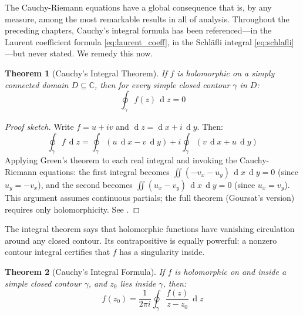 \documentclass[12pt,a4paper]{report}
\DeclareMathOperator{\deriv}{d}
\theoremstyle{thms}
\newtheorem{theorem}{Theorem}[section]
\theoremstyle{defns}
\begin{document}
The Cauchy-Riemann equations have a global consequence that is, by any measure, among the most remarkable results in all of analysis. Throughout the preceding chapters, Cauchy's integral formula has been referenced—in the Laurent coefficient formula \eqref{eq:laurent_coeff}, in the Schl\"{a}fli integral \eqref{eq:schlafli}—but never stated. We remedy this now.

\begin{theorem}[Cauchy's Integral Theorem]
    If $f$ is holomorphic on a simply connected domain $D \subseteq \mathbb{C}$, then for every simple closed contour $\gamma$ in $D$:
    \begin{equation}
        \oint_\gamma f(z)\,\deriv{z} = 0
    \end{equation}
\end{theorem}

\begin{proof}[Proof sketch]
    Write $f = u + iv$ and $\deriv{z} = \deriv{x} + i\,\deriv{y}$. Then:
    \begin{equation}
        \oint_\gamma f\,\deriv{z} = \oint_\gamma (u\,\deriv{x} - v\,\deriv{y}) + i\oint_\gamma (v\,\deriv{x} + u\,\deriv{y})
    \end{equation}
    Applying Green's theorem to each real integral and invoking the Cauchy-Riemann equations: the first integral becomes $\iint(-v_x - u_y)\,\deriv{x}\,\deriv{y} = 0$ (since $u_y = -v_x$), and the second becomes $\iint(u_x - v_y)\,\deriv{x}\,\deriv{y} = 0$ (since $u_x = v_y$). This argument assumes continuous partials; the full theorem (Goursat's version) requires only holomorphicity. See \cite{ahlfors_complex}.
\end{proof}

The integral theorem says that holomorphic functions have vanishing circulation around any closed contour. Its contrapositive is equally powerful: a nonzero contour integral certifies that $f$ has a singularity inside.

\begin{theorem}[Cauchy's Integral Formula]
    If $f$ is holomorphic on and inside a simple closed contour $\gamma$, and $z_0$ lies inside $\gamma$, then:
    \begin{equation}
        f(z_0) = \dfrac{1}{2\pi i}\oint_\gamma \dfrac{f(z)}{z - z_0}\,\deriv{z}
        \label{eq:cauchy_formula}
    \end{equation}
\end{theorem}
\end{document}
